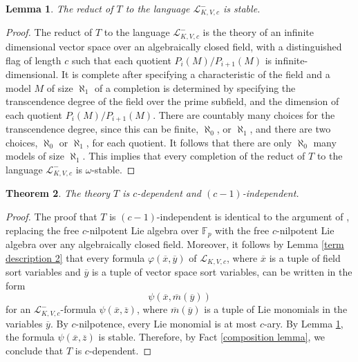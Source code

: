\documentclass[psamsfonts]{amsart}
\newtheorem{thm}{Theorem}[section]
\newtheorem{lem}[thm]{Lemma}
\theoremstyle{definition}
\theoremstyle{definition}
\theoremstyle{remark}
\numberwithin{equation}{section}
\newcommand\LL{\mathscr{L}}
\begin{document}
\begin{lem} \label{reduct is stable}
    The reduct of $T$ to the language $\LL^{-}_{K,V,c}$ is stable.
\end{lem}

\begin{proof}
 The reduct of $T$ to the language $\LL^{-}_{K,V,c}$ is the theory of an infinite dimensional vector space over an algebraically closed field, with a distinguished flag of length $c$ such that each quotient $P_{i}(M)/P_{i+1}(M)$ is infinite-dimensional. It is complete after specifying a characteristic of the field and a model $M$ of size $\aleph_{1}$ of a completion is determined by specifying the transcendence degree of the field over the prime subfield, and the dimension of each quotient $P_{i}(M)/P_{i+1}(M)$.  There are countably many choices for the transcendence degree, since this can be finite, $\aleph_{0}$, or $\aleph_{1}$, and there are two choices, $\aleph_{0}$ or $\aleph_{1}$, for each quotient. It follows that there are only $\aleph_{0}$ many models of size $\aleph_{1}$.  This implies that every completion of the reduct of $T$ to the language $\LL^{-}_{K,V,c}$ is $\omega$-stable.  
\end{proof}

\begin{thm}
    The theory $T$ is $c$-dependent and $(c-1)$-independent.  
\end{thm}

\begin{proof}
    The proof that $T$ is $(c-1)$-independent is identical to the argument of \cite[Theorem 5.20]{d2023model}, replacing the free $c$-nilpotent Lie algebra over $\mathbb{F}_{p}$ with the free $c$-nilpotent Lie algebra over any algebraically closed field. Moreover, it follows by Lemma \ref{term description 2} that every formula $\varphi(\overline{x},\overline{y})$ of $\LL_{K,V,c}$, where $\overline{x}$ is a tuple of field sort variables and $\overline{y}$ is a tuple of vector space sort variables, can be written in the form 
    $$
    \psi(\overline{x},\overline{m}(\overline{y}))
    $$
    for an $\LL_{K,V,c}^{-}$-formula $\psi(\overline{x},\overline{z})$, where $\overline{m}(\overline{y})$ is a tuple of Lie monomials in the variables $\overline{y}$. By $c$-nilpotence, every Lie monomial is at most $c$-ary.  By Lemma \ref{reduct is stable}, the formula $\psi(\overline{x},\overline{z})$ is stable. Therefore, by Fact \ref{composition lemma}, we conclude that $T$ is $c$-dependent. 
\end{proof}
\end{document}
